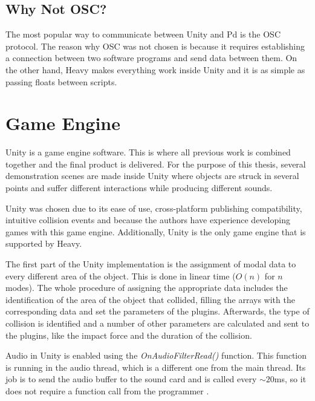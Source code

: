 \subsection{Why Not OSC?}
The most popular way to communicate between Unity\textsuperscript{\textregistered} and \gls{Pd} is the \gls{OSC} protocol. The reason why OSC was not chosen is because it requires establishing a connection between two software programs and send data between them. On the other hand, Heavy makes everything work inside Unity\textsuperscript{\textregistered} and it is as simple as passing floats between scripts. 

\section{Game Engine}
Unity\textsuperscript{\textregistered} is a game engine software. This is where all previous work is combined together and the final product is delivered. For the purpose of this thesis, several demonstration scenes are made inside Unity\textsuperscript{\textregistered} where objects are struck in several points and suffer different interactions while producing different sounds. 

Unity\textsuperscript{\textregistered} was chosen due to its ease of use, cross-platform publishing compatibility, intuitive collision events and because the authors have experience developing games with this game engine. Additionally, Unity\textsuperscript{\textregistered} is the only game engine that is supported by Heavy.

The first part of the Unity\textsuperscript{\textregistered} implementation is the assignment of modal data to every different area of the object. This is done in linear time ($O(n)$ for $n$ modes). The whole procedure of assigning the appropriate data includes the identification of the area of the object that collided, filling the arrays with the corresponding data and set the parameters of the plugins. Afterwards, the type of collision is identified and a number of other parameters are calculated and sent to the plugins, like the impact force and the duration of the collision.

Audio in Unity\textsuperscript{\textregistered} is enabled using the \textit{OnAudioFilterRead()} function. This function is running in the audio thread, which is a different one from the main thread. Its job is to send the audio buffer to the sound card and is called every $\sim 20$ms, so it does not require a function call from the programmer \cite{bib:unity_doc}.

